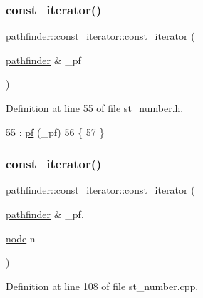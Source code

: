\subsubsection{\texorpdfstring{const\+\_\+iterator()}{const\_iterator()}\hspace{0.1cm}{\footnotesize\ttfamily [1/2]}}
{\footnotesize\ttfamily pathfinder\+::const\+\_\+iterator\+::const\+\_\+iterator (\begin{DoxyParamCaption}\item[{\mbox{\hyperlink{classpathfinder}{pathfinder}} \&}]{\+\_\+pf }\end{DoxyParamCaption})\hspace{0.3cm}{\ttfamily [inline]}}



Definition at line 55 of file st\+\_\+number.\+h.


\begin{DoxyCode}
55                                     : \mbox{\hyperlink{classpathfinder_1_1const__iterator_a913c0268881f3da2ae1b95165a21a85d}{pf}} (\_pf)
56     \{
57     \}
\end{DoxyCode}
\mbox{\label{classpathfinder_1_1const__iterator_acbaabfa04503076ff34db02d03c2e05e}} 
\subsubsection{\texorpdfstring{const\+\_\+iterator()}{const\_iterator()}\hspace{0.1cm}{\footnotesize\ttfamily [2/2]}}
{\footnotesize\ttfamily pathfinder\+::const\+\_\+iterator\+::const\+\_\+iterator (\begin{DoxyParamCaption}\item[{\mbox{\hyperlink{classpathfinder}{pathfinder}} \&}]{\+\_\+pf,  }\item[{\mbox{\hyperlink{classnode}{node}}}]{n }\end{DoxyParamCaption})}



Definition at line 108 of file st\+\_\+number.\+cpp.


